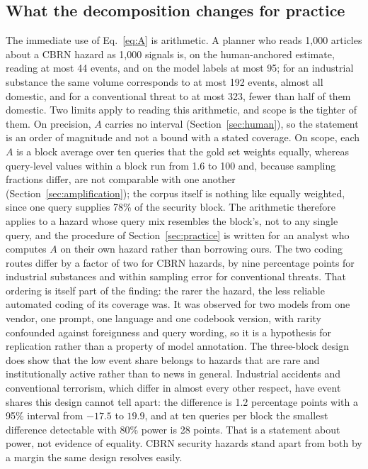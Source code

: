 \documentclass[1p,times]{elsarticle}
\begin{document}
\subsection{What the decomposition changes for practice}
\label{sec:practice-change}
The immediate use of Eq.~\eqref{eq:A} is arithmetic. A planner who reads 1,000 articles about a CBRN hazard as 1,000 signals is, on the human-anchored estimate, reading at most 44 events, and on the model labels at most 95; for an industrial substance the same volume corresponds to at most 192 events, almost all domestic, and for a conventional threat to at most 323, fewer than half of them domestic. Two limits apply to reading this arithmetic, and scope is the tighter of them. On precision, $A$ carries no interval (Section~\ref{sec:human}), so the statement is an order of magnitude and not a bound with a stated coverage. On scope, each $A$ is a block average over ten queries that the gold set weights equally, whereas query-level values within a block run from 1.6 to 100 and, because sampling fractions differ, are not comparable with one another (Section~\ref{sec:amplification}); the corpus itself is nothing like equally weighted, since one query supplies 78\% of the security block. The arithmetic therefore applies to a hazard whose query mix resembles the block's, not to any single query, and the procedure of Section~\ref{sec:practice} is written for an analyst who computes $A$ on their own hazard rather than borrowing ours. The two coding routes differ by a factor of two for CBRN hazards, by nine percentage points for industrial substances and within sampling error for conventional threats. That ordering is itself part of the finding: the rarer the hazard, the less reliable automated coding of its coverage was. It was observed for two models from one vendor, one prompt, one language and one codebook version, with rarity confounded against foreignness and query wording, so it is a hypothesis for replication rather than a property of model annotation. The three-block design does show that the low event share belongs to hazards that are rare and institutionally active rather than to news in general. Industrial accidents and conventional terrorism, which differ in almost every other respect, have event shares this design cannot tell apart: the difference is 1.2 percentage points with a 95\% interval from $-17.5$ to $19.9$, and at ten queries per block the smallest difference detectable with 80\% power is 28 points. That is a statement about power, not evidence of equality. CBRN security hazards stand apart from both by a margin the same design resolves easily.
\end{document}
